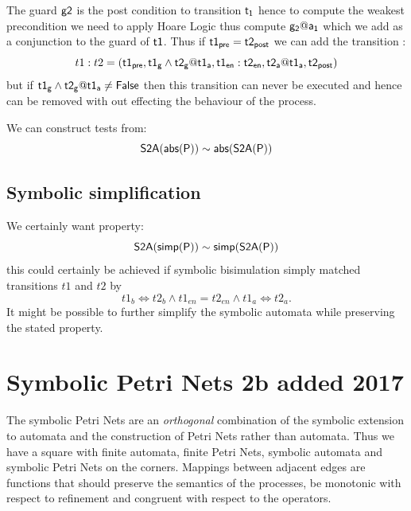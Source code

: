 \documentclass[]{article}
\begin{document}
The guard ${\sf g2}$ is the post condition to transition ${\sf t_1}$ hence to compute the weakest precondition we need to apply Hoare Logic thus compute ${\sf g_2@a_1}$  which we add as a conjunction to the guard of ${\sf t1}$.  Thus  if ${\sf t1_{pre} = t2_{post}}$   we can add the transition :
\[t1: t2 = \sf (t1_{pre}, t1_g\land t2_g@t1_a , t1_{en}:t2_{en}, t2_a@t1_a, t2_{post})\]
but if  ${\sf t1_g\land t2_g@t1_a\neq False}$ then this transition can never be executed and hence can be removed with out effecting the behaviour of the process.

We can construct tests from:
\[{\sf S2A(abs(P))\sim abs(S2A(P))}\]



\subsection{Symbolic simplification}
We certainly want property:
\[{\sf S2A(simp(P))\sim simp(S2A(P))}\]
this could certainly be achieved if symbolic bisimulation simply matched transitions $t1$ and $t2$ by
\[t1_b\Leftrightarrow t2_b \land t1_{en}= t2_{en} \land t1_a\Leftrightarrow t2_a.\]
It might be possible to further simplify the symbolic automata while preserving the stated property.


\section{Symbolic Petri Nets {\color{red} 2b added 2017}}

The symbolic Petri Nets  are an \emph{orthogonal} combination of the symbolic extension to automata and the construction of Petri Nets rather than automata. Thus we have a square with finite automata, finite Petri Nets, symbolic automata and symbolic Petri Nets on the corners. Mappings between adjacent edges  are functions that should preserve the semantics of the processes, be monotonic with respect to refinement and congruent with respect to the operators.
\end{document}

